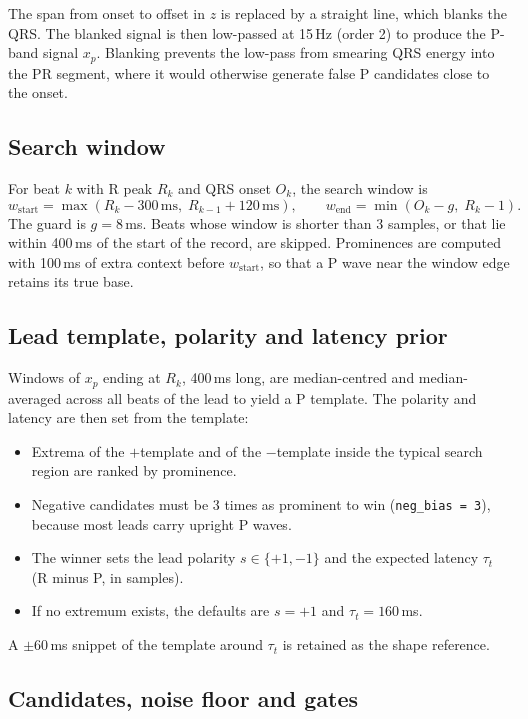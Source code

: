 \documentclass[11pt,a4paper]{article}
\newcommand{\code}[1]{\texttt{#1}}
\newcommand{\ms}{\,\mathrm{ms}}
\begin{document}
The span from onset to offset in $z$ is replaced by a straight line, which blanks the QRS. The blanked signal is then low-passed at 15\,Hz (order 2) to produce the P-band signal $x_p$. Blanking prevents the low-pass from smearing QRS energy into the PR segment, where it would otherwise generate false P candidates close to the onset.

\subsection{Search window}

For beat $k$ with R peak $R_k$ and QRS onset $O_k$, the search window is
\begin{equation}
w_\mathrm{start} = \max\left(R_k - 300\ms,\; R_{k-1} + 120\ms\right), \qquad
w_\mathrm{end} = \min\left(O_k - g,\; R_k - 1\right).
\end{equation}
The guard is $g = 8$\,ms. Beats whose window is shorter than 3 samples, or that lie within 400\,ms of the start of the record, are skipped. Prominences are computed with 100\,ms of extra context before $w_\mathrm{start}$, so that a P wave near the window edge retains its true base.

\subsection{Lead template, polarity and latency prior}

Windows of $x_p$ ending at $R_k$, 400\,ms long, are median-centred and median-averaged across all beats of the lead to yield a P template. The polarity and latency are then set from the template:
\begin{itemize}
\item Extrema of the $+$template and of the $-$template inside the typical search region are ranked by prominence.
\item Negative candidates must be 3 times as prominent to win (\code{neg\_bias = 3}), because most leads carry upright P waves.
\item The winner sets the lead polarity $s \in \{+1, -1\}$ and the expected latency $\tau_t$ (R minus P, in samples).
\item If no extremum exists, the defaults are $s = +1$ and $\tau_t = 160$\,ms.
\end{itemize}
A $\pm60$\,ms snippet of the template around $\tau_t$ is retained as the shape reference.

\subsection{Candidates, noise floor and gates}
\label{sec:gates}
\end{document}
